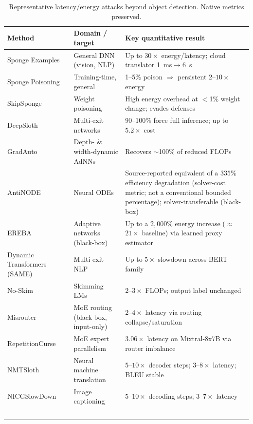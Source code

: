 \documentclass[acmsmall,screen,review,nonacm]{acmart}
\begin{document}
\begin{table}[htbp]
  \caption{Representative latency/energy attacks beyond object detection. Native metrics preserved.}
  \label{tab:general-attacks}
  \small
  \begin{tabularx}{\linewidth}{L{2.4cm} L{2.4cm} X}
    \toprule
    \textbf{Method} & \textbf{Domain / target} & \textbf{Key quantitative result} \\
    \midrule
    Sponge Examples~\cite{shumailov2021sponge} & General DNN (vision, NLP) & Up to $30\times$ energy/latency; cloud translator 1~ms$\to$6~s \\
    Sponge Poisoning~\cite{cina2022sponge} & Training-time, general & 1--5\% poison $\Rightarrow$ persistent $2$--$10\times$ energy \\
    SkipSponge~\cite{telintelo2024skipsponge} & Weight poisoning & High energy overhead at $<$1\% weight change; evades defenses \\
    DeepSloth~\cite{hong2021deepsloth} & Multi-exit networks & 90--100\% force full inference; up to $5.2\times$ cost \\
    GradAuto~\cite{pan2022gradauto} & Depth- \& width-dynamic AdNNs & Recovers $\sim$100\% of reduced FLOPs \\
    AntiNODE~\cite{haque2023antinode} & Neural ODEs & Source-reported equivalent of a $335\%$ efficiency degradation (solver-cost metric; not a conventional bounded percentage); solver-transferable (black-box) \\
    EREBA~\cite{haque2022ereba} & Adaptive networks (black-box) & Up to a $2{,}000\%$ energy increase ($\approx$$21\times$ baseline) via learned proxy estimator \\
    Dynamic Transformers (SAME)~\cite{chen2023dynamic} & Multi-exit NLP & Up to $5\times$ slowdown across BERT family \\
    No-Skim~\cite{zhang2023noskim} & Skimming LMs & $2$--$3\times$ FLOPs; output label unchanged \\
    Misrouter~\cite{fei2026misrouter} & MoE routing (black-box, input-only) & $2$--$4\times$ latency via routing collapse/saturation \\
    RepetitionCurse~\cite{huang2025repetitioncurse} & MoE expert parallelism & $3.06\times$ latency on Mixtral-8x7B via router imbalance \\
    NMTSloth~\cite{chen2022nmtsloth} & Neural machine translation & $5$--$10\times$ decoder steps; $3$--$8\times$ latency; BLEU stable \\
    NICGSlowDown~\cite{chen2022nicgslowdown} & Image captioning & $5$--$10\times$ decoding steps; $3$--$7\times$ latency \\
$$
\end{tabularx}
\end{table}
\end{document}
